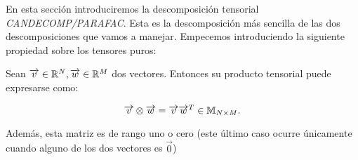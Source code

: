 En esta sección introduciremos la descomposición tensorial \textit{CANDECOMP/PARAFAC}. Esta es la descomposición más sencilla de las dos descomposiciones que vamos a manejar. Empecemos introduciendo la siguiente propiedad sobre los tensores puros:

\begin{proposicion}
	Sean $\overrightarrow{v} \in \mathbb{R}^{N}, \overrightarrow{w} \in \mathbb{R}^{M}$ dos vectores. Entonces su producto tensorial puede expresarse como:

	$$\overrightarrow{v} \otimes \overrightarrow{w} = \overrightarrow{v} \overrightarrow{w}^T \in \mathbb{M}_{N \times M}.$$

	Además, esta matriz es de rango uno o cero (este último caso ocurre únicamente cuando alguno de los dos vectores es $\vec{0}$)
\end{proposicion}

